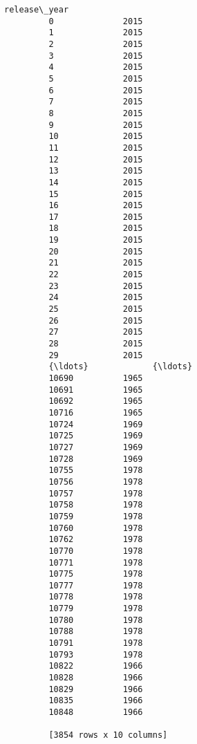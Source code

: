 \documentclass[11pt]{article}
\begin{document}
\begin{Verbatim}[commandchars=\\\{\}]
                release\_year  
         0              2015  
         1              2015  
         2              2015  
         3              2015  
         4              2015  
         5              2015  
         6              2015  
         7              2015  
         8              2015  
         9              2015  
         10             2015  
         11             2015  
         12             2015  
         13             2015  
         14             2015  
         15             2015  
         16             2015  
         17             2015  
         18             2015  
         19             2015  
         20             2015  
         21             2015  
         22             2015  
         23             2015  
         24             2015  
         25             2015  
         26             2015  
         27             2015  
         28             2015  
         29             2015  
         {\ldots}             {\ldots}  
         10690          1965  
         10691          1965  
         10692          1965  
         10716          1965  
         10724          1969  
         10725          1969  
         10727          1969  
         10728          1969  
         10755          1978  
         10756          1978  
         10757          1978  
         10758          1978  
         10759          1978  
         10760          1978  
         10762          1978  
         10770          1978  
         10771          1978  
         10775          1978  
         10777          1978  
         10778          1978  
         10779          1978  
         10780          1978  
         10788          1978  
         10791          1978  
         10793          1978  
         10822          1966  
         10828          1966  
         10829          1966  
         10835          1966  
         10848          1966  
         
         [3854 rows x 10 columns]
\end{Verbatim}
            
\end{document}
